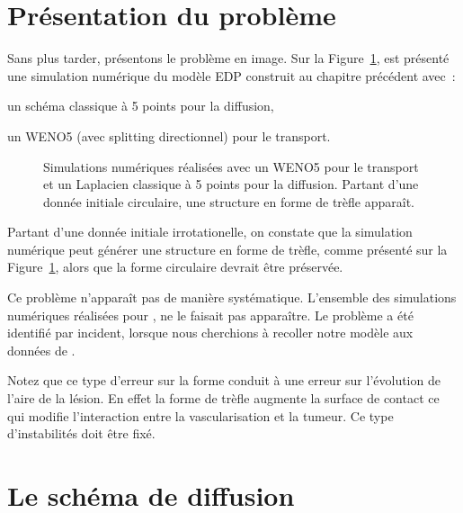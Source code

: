 \documentclass[main.tex]{subfiles}
\begin{document}
\section{Présentation du problème}
Sans plus tarder, présentons le problème en image. Sur la Figure~\ref{fig:trefle}, est présenté une simulation numérique du modèle EDP construit au chapitre précédent avec~:
\begin{myitemize}
\item un schéma classique à 5 points pour la diffusion,
\item un WENO5 (avec splitting directionnel) pour le transport.
\end{myitemize}
\begin{figure}
\centering
\caption{\label{fig:trefle} Simulations numériques réalisées avec un WENO5 pour le transport et un Laplacien classique à 5 points pour la diffusion. Partant d'une donnée initiale circulaire, 
une structure en forme de trèfle apparaît.}
\end{figure}

Partant d'une donnée initiale irrotationelle, on constate que la simulation numérique peut générer une structure en forme de trèfle, comme présenté sur la Figure~\ref{fig:trefle}, alors que la forme circulaire devrait être préservée. 

Ce problème n'apparaît pas de manière systématique. L'ensemble des simulations numériques réalisées pour \Nber, ne le faisait pas apparaître. Le problème a été identifié par incident, lorsque nous cherchions à recoller notre modèle aux données de \Chen. 


Notez que ce type d'erreur sur la forme conduit à une erreur sur l'évolution de l'aire de la lésion. En effet la forme de trèfle augmente la surface de contact ce qui modifie l'interaction entre la vascularisation et la tumeur. Ce type d'instabilités doit être fixé.


\section{Le schéma de diffusion}
\end{document}
